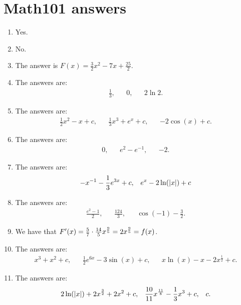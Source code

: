 \newpage
\section{Math101 answers}

\begin{enumerate}
	\item Yes.
	
	
	\item No.
	
	\item The answer is $F(x)=\frac{3}{2}x^2-7x+\frac{25}{2}$.
	
	\item The answers are:
	\begin{align*}
	\frac{1}{3},&& 0, && 2\ln 2. 
	\end{align*}
		
	
	\item The answers are:
	\begin{align*}
	\frac{1}{2}x^2-x+c, && \frac{1}{3}x^3+e^x+c,&& -2\cos(x)+c.
	\end{align*}
	
	\item The answers are:
	\begin{align*}
	0,&& e^2-e^{-1}, && -2.
	\end{align*}
	
	\item The answers are:
	\begin{align*}
	-x^{-1}-\frac{1}{3}e^{3x}+c ,&& e^{x}-2\ln(\vert x\vert)+c
	\end{align*}
	
	
	\item The answers are:
	\begin{align*}
	\frac{e^2-1}{2},&&   \frac{124}{3},&& \cos(-1)-\frac{3}{2}.
	\end{align*}
	
	
	
	
	
	\item We have that $F'(x)=\frac{5}{7}\cdot\frac{14}{5}x^{\frac{9}{5}}=2x^{\frac{9}{5}}=f(x)$.
	
	\item The answers are:
	\begin{align*}
	x^3+x^2+c,&& \frac{1}{2}e^{6x}-3\sin(x)+c,&& x\ln(x)-x-2x^{\frac{1}{2}}+c.
	\end{align*}
	

	
	\item The answers are:
	\begin{align*}
	2\ln(\vert x\vert)+2x^{\frac{3}{2}}+2x^2+c,&& \frac{10}{11}x^{\frac{11}{8}}-\frac{1}{3}x^3+c,&& c.
	\end{align*}
	

\end{enumerate}
